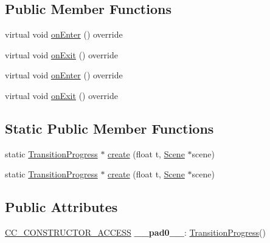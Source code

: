 \subsection*{Public Member Functions}
\begin{DoxyCompactItemize}
\item 
virtual void \hyperlink{classTransitionProgress_a4bb6172fb74abe0a0a0de2a3742a9cf6}{on\+Enter} () override
\item 
virtual void \hyperlink{classTransitionProgress_a19b22f6e9a1d4e48d1d4b61e17fec363}{on\+Exit} () override
\item 
virtual void \hyperlink{classTransitionProgress_aa3ccb7515691f10b5410b75d912e2b68}{on\+Enter} () override
\item 
virtual void \hyperlink{classTransitionProgress_a8682fe8c7c42a31c6796bff2e4e1fef5}{on\+Exit} () override
\end{DoxyCompactItemize}
\subsection*{Static Public Member Functions}
\begin{DoxyCompactItemize}
\item 
static \hyperlink{classTransitionProgress}{Transition\+Progress} $\ast$ \hyperlink{classTransitionProgress_ade047171446ee0abbdc022522f84d2ff}{create} (float t, \hyperlink{classScene}{Scene} $\ast$scene)
\item 
static \hyperlink{classTransitionProgress}{Transition\+Progress} $\ast$ \hyperlink{classTransitionProgress_ad88fb0bc6247c6e96f5b0e1fb08bc505}{create} (float t, \hyperlink{classScene}{Scene} $\ast$scene)
\end{DoxyCompactItemize}
\subsection*{Public Attributes}
\begin{DoxyCompactItemize}
\item 
\mbox{\label{classTransitionProgress_a801573edbe0136711092f230f6bf820b}} 
\hyperlink{_2cocos2d_2cocos_2base_2ccConfig_8h_a25ef1314f97c35a2ed3d029b0ead6da0}{C\+C\+\_\+\+C\+O\+N\+S\+T\+R\+U\+C\+T\+O\+R\+\_\+\+A\+C\+C\+E\+SS} {\bfseries \+\_\+\+\_\+pad0\+\_\+\+\_\+}\+: \hyperlink{classTransitionProgress}{Transition\+Progress}()
\end{DoxyCompactItemize}
